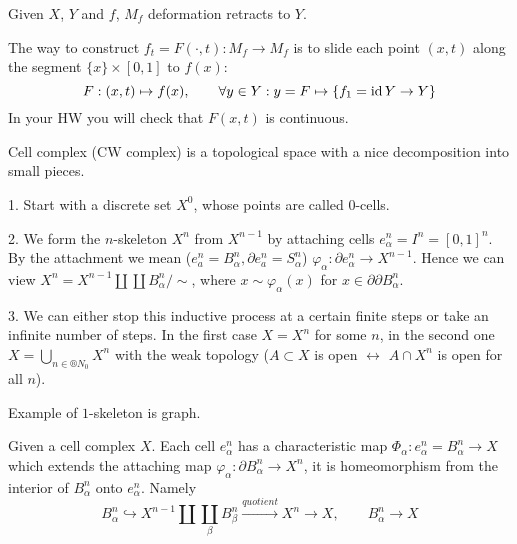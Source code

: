 \documentclass[12pt]{article}					%
\begin{document}
\begin{tvrzeni}
	Given $X$, $Y$ and $f$, $M_f$ deformation retracts to $Y$.

	\begin{dukazin}
		The way to construct $f_t = F(·, t): M_f \rightarrow M_f$ is to slide each point $(x, t)$ along the segment $\{x\}\times[0, 1]$ to $f(x)$:
		$$ F: (x, t) \mapsto f(x), \qquad \forall y \in Y: y = F \mapsto \{f_1 = \operatorname{id} Y \rightarrow Y\} $$
		In your HW you will check that $F(x, t)$ is continuous.
	\end{dukazin}
\end{tvrzeni}

\begin{definice}
	\begin{poznamkain}
		Cell complex (CW complex) is a topological space with a nice decomposition into small pieces.
	\end{poznamkain}

	1. Start with a discrete set $X^0$, whose points are called $0$-cells.

	2. We form the $n$-skeleton $X^n$ from $X^{n - 1}$ by attaching cells $e_α^n = I^n = [0, 1]^n$. By the attachment we mean ($e_a^n = B_α^n, \partial e_a^n = S_α^n$) $φ_α: \partial e_α^n \rightarrow X^{n-1}$. Hence we can view $X^n = X^{n-1} \coprod \coprod B_α^n / \sim$, where $x \sim φ_α(x)$ for $x \in \partial \partial B_α^n$.

	3. We can either stop this inductive process at a certain finite steps or take an infinite number of steps. In the first case $X = X^n$ for some $n$, in the second one $X = \bigcup_{n \in ®N_0} X^n$ with the weak topology ($A \subset X$ is open $\leftrightarrow$ $A \cap X^n$ is open for all $n$).

	\begin{prikladyin}
		Example of $1$-skeleton is graph.
	\end{prikladyin}
\end{definice}

\begin{definice}
	Given a cell complex $X$. Each cell $e_α^n$ has a characteristic map $Φ_α: e_α^n = B_α^n \rightarrow X$ which extends the attaching map $φ_α: \partial B_α^n \rightarrow X^n$, it is homeomorphism from the interior of $B_α^n$ onto $e_α^n$. Namely
	$$ B_α^n \hookrightarrow X^{n-1} \coprod \coprod_β B_β^n \overset{quotient}\rightarrow X^n \rightarrow X, \qquad B_α^n \rightarrow X $$
\end{definice}
\end{document}
